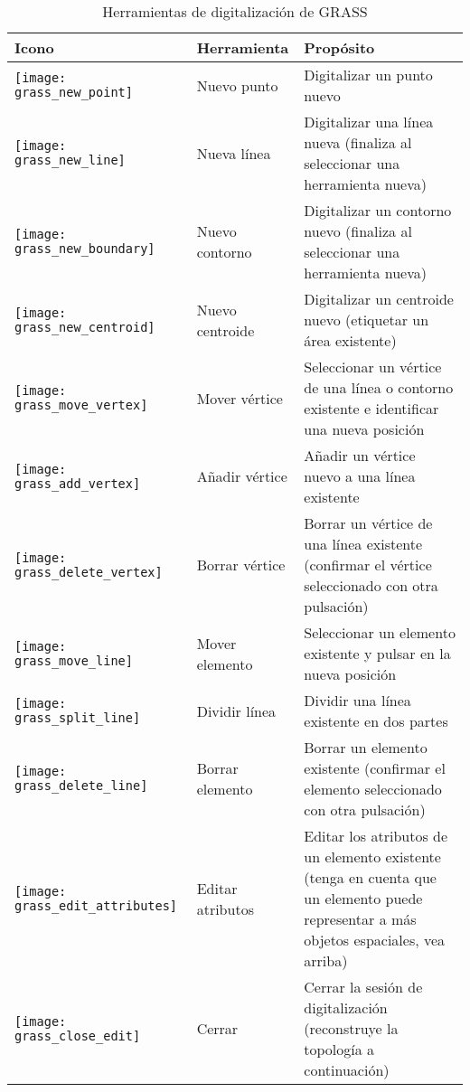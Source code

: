 \begin{table}[h]
\centering
\caption{Herramientas de digitalización de GRASS}\label{tab:grass_tools}\medskip
 \begin{tabular}{|l|l|p{5in}|}
 \hline \textbf{Icono} & \textbf{Herramienta} & \textbf{Propósito} \\
\hline \texttt{[image: grass\_new\_point]} & Nuevo punto & Digitalizar un punto nuevo \\
\hline \texttt{[image: grass\_new\_line]} & Nueva línea &  Digitalizar una línea nueva (finaliza al seleccionar una herramienta nueva) \\
\hline \texttt{[image: grass\_new\_boundary]} & Nuevo contorno & Digitalizar un contorno nuevo (finaliza al seleccionar una herramienta nueva)\\
\hline \texttt{[image: grass\_new\_centroid]} & Nuevo centroide & Digitalizar un centroide nuevo (etiquetar un área existente)\\
\hline \texttt{[image: grass\_move\_vertex]} & Mover vértice & Seleccionar un vértice de una línea o contorno existente e identificar una nueva posición\\
\hline \texttt{[image: grass\_add\_vertex]} & Añadir vértice & Añadir un vértice nuevo a una línea existente\\
\hline \texttt{[image: grass\_delete\_vertex]} & Borrar vértice & Borrar un vértice de una línea existente (confirmar el vértice seleccionado con otra pulsación)\\
\hline \texttt{[image: grass\_move\_line]} & Mover elemento & Seleccionar un elemento existente y pulsar en la nueva posición\\
\hline \texttt{[image: grass\_split\_line]} & Dividir línea & Dividir una línea existente en dos partes\\
\hline \texttt{[image: grass\_delete\_line]} & Borrar elemento & Borrar un elemento existente (confirmar el elemento seleccionado con otra pulsación)\\
\hline \texttt{[image: grass\_edit\_attributes]} & Editar atributos & Editar los atributos de un elemento existente (tenga en cuenta que un elemento puede representar a más objetos espaciales, vea arriba)\\
\hline \texttt{[image: grass\_close\_edit]} & Cerrar & Cerrar la sesión de digitalización (reconstruye la topología a continuación)\\
\hline
\end{tabular}
\end{table}

